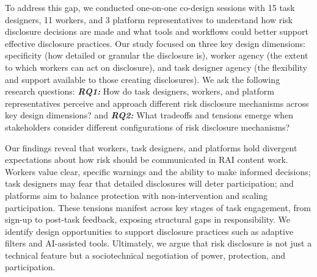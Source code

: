

To address this gap, we conducted one-on-one co-design sessions \cite{tang2024ai,kuo2023understanding} with 15 task designers, 11 workers, and 3 platform representatives to understand how risk disclosure decisions are made and what tools and workflows could better support effective disclosure practices. Our study focused on three key design dimensions: specificity (how detailed or granular the disclosure is), worker agency (the extent to which workers can act on disclosure), and task designer agency (the flexibility and support available to those creating disclosures). We ask the following research questions:\textbf{\textit{ RQ1:}} How do task designers, workers, and platform representatives perceive and approach different risk disclosure mechanisms across key design dimensions? and \textbf{\textit{RQ2: }}What tradeoffs and tensions emerge when stakeholders consider different configurations of risk disclosure mechanisms?  
 

Our findings reveal that workers, task designers, and platforms hold divergent expectations about how risk should be communicated in RAI content work. Workers value clear, specific warnings and the ability to make informed decisions; task designers may fear that detailed disclosures will deter participation; and platforms aim to balance protection with non-intervention and scaling participation. These tensions manifest across key stages of task engagement, from sign-up to post-task feedback, exposing structural gaps in responsibility. We identify design opportunities to support disclosure practices such as adaptive filters and AI-assisted tools. Ultimately, we argue that risk disclosure is not just a technical feature but a sociotechnical negotiation of power, protection, and participation. 


